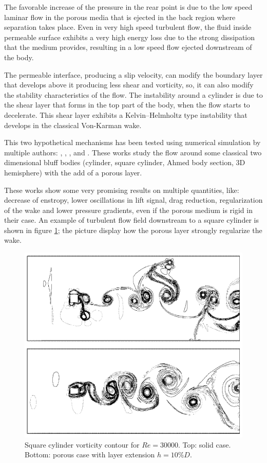 The favorable increase of the pressure in the rear point is due to the low speed laminar flow in the porous media that is ejected in the back region where separation takes place.
Even in very high speed turbulent flow, the fluid inside permeable surface exhibits a very high energy loss due to the strong dissipation that the medium provides, resulting in a low speed flow ejected downstream of the body.

The permeable interface, producing a slip velocity, can modify the boundary layer that develops above it producing less shear and vorticity, so, it can also modify the stability characteristics of the flow.
The instability around a cylinder is due to the shear layer that forms in the top part of the body, when the flow starts to decelerate.
This shear layer exhibits a Kelvin–Helmholtz type instability that develops in the classical Von-Karman wake.

This two hypothetical mechanisms has been tested using numerical simulation by multiple authors: \citet{bruneau2004passive}, \citet{bruneau2008numerical}, \citet{bhattacharyya2011reduction}, \citet{naito2012numerical} and \citet{mimeau2017passive}.
These works study the flow around some classical two dimensional bluff bodies (cylinder, square cylinder, Ahmed body section, 3D hemisphere) with the add of a porous layer.

These works show some very promising results on multiple quantities, like: decrease of enstropy, lower oscillations in lift signal, drag reduction, regularization of the wake and lower pressure gradients, even if the porous medium is rigid in their case.
An example of turbulent flow field downstream to a square cylinder is shown in figure \ref{fig:porous_cylinder}; the picture display how the porous layer strongly regularize the wake.

\begin{figure}[h]
	\centering
	\includegraphics[width=0.7\linewidth]{chapter_1/cylinder_porous}
	\caption{Square cylinder vorticity contour for $Re=30000$. Top: solid case. Bottom: porous case with layer extension $h=10\% D$.}
	\label{fig:porous_cylinder}
\end{figure}



